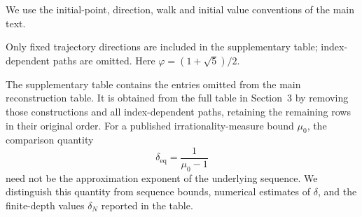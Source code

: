 \documentclass[oneside,english,11pt]{amsart}
\begin{document}
We use the initial-point, direction, walk and initial value conventions of the
main text.

Only fixed trajectory directions are included in the supplementary table;
index-dependent paths are omitted. Here $\varphi=(1+\sqrt5)/2$.

The supplementary table contains the entries omitted from the main
reconstruction table. It is obtained from the full table in Section~3 by
removing those constructions and all index-dependent paths, retaining
the remaining rows in their original order. For a published
irrationality-measure bound $\mu_0$, the comparison quantity
\[
  \delta_{\mathrm{eq}}=\frac{1}{\mu_0-1}
\]
need not be the approximation exponent of the underlying sequence.
We distinguish this quantity from sequence bounds, numerical estimates
of $\delta$, and the finite-depth values $\delta_N$ reported in the table.
\end{document}

